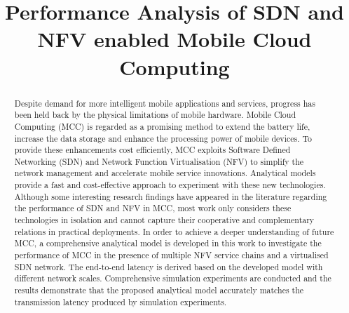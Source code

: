 \documentclass[conference]{IEEEtran}
\begin{document}
\title{Performance Analysis of SDN and NFV enabled Mobile Cloud Computing}

\author{
}
 
\maketitle

\begin{abstract}
Despite demand for more intelligent mobile applications and services, progress has been held back by the physical limitations of mobile hardware. Mobile Cloud Computing (MCC) is regarded as a promising method to extend the battery life, increase the data storage and enhance the processing power of mobile devices. To provide these enhancements cost efficiently, MCC exploits Software Defined Networking (SDN) and Network Function Virtualisation (NFV) to simplify the network management and accelerate mobile service innovations. Analytical models provide a fast and cost-effective approach to experiment with these new technologies. Although some interesting research findings have appeared in the literature regarding the performance of SDN and NFV in MCC, most work only considers these technologies in isolation and cannot capture their cooperative and complementary relations in practical deployments. In order to achieve a deeper understanding of future MCC, a comprehensive analytical model is developed in this work to investigate the performance of MCC in the presence of multiple NFV service chains and a virtualised SDN network. The end-to-end latency is derived based on the developed model with different network scales. Comprehensive simulation experiments are conducted and the results demonstrate that the proposed analytical model accurately matches the transmission latency produced by simulation experiments.
\end{abstract}










% 





\end{document}

